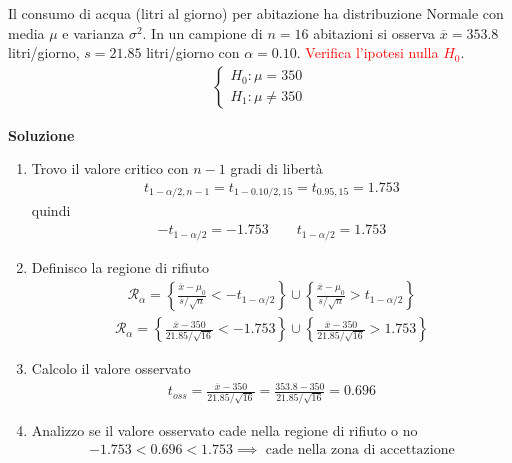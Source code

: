 \documentclass{article}  %
\theoremstyle{definition}
\begin{document}
\begin{esercizio}
	Il consumo di acqua (litri al giorno) per abitazione ha distribuzione Normale con media $\mu$ e varianza $\sigma^2$.
	In un campione di $n=16$ abitazioni si osserva $\overline{x}=353.8$ litri/giorno, $s=21.85$ litri/giorno con $\alpha=0.10$.
	\textcolor{red}{Verifica l'ipotesi nulla $H_0$}.
	\begin{align*}
		\begin{cases}
			H_0: \mu = 350 \\
			H_1: \mu \neq 350
		\end{cases}
	\end{align*}
	\begin{center}
		\textbf{Soluzione}
	\end{center}
	\begin{enumerate}
		\item Trovo il valore critico con $n-1$ gradi di libertà
		      \begin{align*}
			      t_{1-\alpha/2, n-1}=t_{1-0.10/2, 15}=t_{0.95, 15}=1.753
		      \end{align*}
		      quindi
		      \begin{align*}
			      -t_{1-\alpha/2}=-1.753 \quad \quad t_{1-\alpha/2}=1.753
		      \end{align*}
		\item Definisco la regione di rifiuto
		      \begin{align*}
			      \mathcal{R}_{\alpha}=\left\{\frac{\overline{x}-\mu_0}{s/\sqrt{n}}< -t_{1-\alpha/2} \right\} \cup
			      \left\{\frac{\overline{x}-\mu_0}{s/\sqrt{n}} > t_{1-\alpha/2} \right\}
		      \end{align*}
		      \begin{align*}
			      \mathcal{R}_{\alpha}=\left\{\frac{\overline{x}-350}{21.85/\sqrt{16}}< -1.753 \right\} \cup
			      \left\{\frac{\overline{x}-350}{21.85/\sqrt{16}} > 1.753 \right\}
		      \end{align*}
		\item Calcolo il valore osservato
		      \begin{align*}
			      t_{oss} = \frac{\overline{x}-350}{21.85/\sqrt{16}} = \frac{353.8-350}{21.85/\sqrt{16}} = 0.696
		      \end{align*}
		\item Analizzo se il valore osservato cade nella regione di rifiuto o no
		      \begin{align*}
			      -1.753 < 0.696 < 1.753 \implies \text{ cade nella zona di accettazione} \\

\end{align*}
\end{enumerate}
\end{esercizio}
\end{document}
